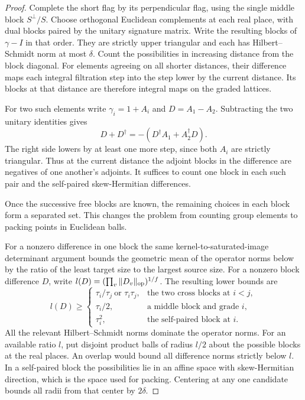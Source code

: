\begin{proof}

Complete the short flag by its perpendicular flag, using
the single middle block \(S^\perp/S\). Choose orthogonal
Euclidean complements at each real place, with dual blocks
paired by the unitary signature matrix. Write the resulting
blocks of \(\gamma-I\) in that order. They are strictly
upper triangular and each has Hilbert--Schmidt norm at
most \(\delta\). Count the possibilities in increasing
distance from the block diagonal. For elements agreeing on
all shorter distances, their difference maps each integral
filtration step into the step lower by the current distance.
Its blocks at that distance are therefore integral maps on
the graded lattices.

For two such elements write \(\gamma_i=1+A_i\) and
\(D=A_1-A_2\). Subtracting the two unitary identities gives
\[
      D+D^\dagger=-(D^\dagger A_1+A_2^\dagger D).
\]
The right side lowers by at least one more step, since
both \(A_i\) are strictly triangular. Thus at the current
distance the adjoint blocks in the difference are negatives
of one another's adjoints. It
suffices to count one block in each such pair and the
self-paired skew-Hermitian differences.


Once the successive free blocks are known, the remaining choices in each block form a separated set. This changes the problem from counting group elements to packing points in Euclidean balls.


For a nonzero difference in one block the same
kernel-to-saturated-image determinant argument bounds the
geometric mean of the operator norms below by the ratio
of the least target size to the largest source size.
For a nonzero block difference \(D\), write
\(l(D)=(\prod_v\|D_v\|_{\rm op})^{1/f}\). The resulting lower bounds are
\[
 l(D)\ge
 \begin{cases}
 \tau_i/\tau_j\ \text{or }\tau_i\tau_j,
                        &\text{the two cross blocks at }i<j,\\
 \tau_i/2,              &\text{a middle block and grade }i,\\
 \tau_i^2,              &\text{the self-paired block at }i .
 \end{cases}
\]
All the relevant Hilbert--Schmidt norms dominate the
operator norms. For an available ratio \(l\), put disjoint
product balls of radius \(l/2\) about the possible blocks
at the real places. An overlap would bound all difference
norms strictly below \(l\). In a self-paired block the
possibilities lie in an affine space with skew-Hermitian
direction, which is the space used for packing. Centering
at any one candidate bounds all radii from that center
by \(2\delta\).


\end{proof}

